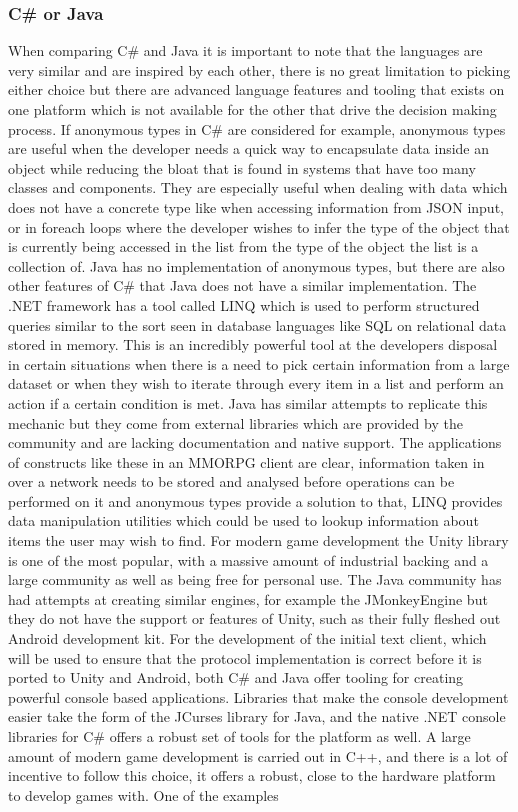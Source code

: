 \documentclass{article}
\begin{document}
	\subsubsection{C\# or Java}
	When comparing C\# and Java it is important to note that the languages are very similar and are inspired by each other, there is no great limitation to picking either choice but there are advanced language features and tooling that exists on one platform which is not available for the other that drive the decision making process. If anonymous types in C\# are considered for example, anonymous types are useful when the developer needs a quick way to encapsulate data inside an object while reducing the bloat that is found in systems that have too many classes and components. They are especially useful when dealing with data which does not have a concrete type like when accessing information from JSON input, or in foreach loops where the developer wishes to infer the type of the object that is currently being accessed in the list from the type of the object the list is a collection of. Java has no implementation of anonymous types, but there are also other features of C\# that Java does not have a similar implementation. The .NET framework has a tool called LINQ which is used to perform structured queries similar to the sort seen in database languages like SQL on relational data stored in memory. This is an incredibly powerful tool at the developers disposal in certain situations when there is a need to pick certain information from a large dataset or when they wish to iterate through every item in a list and perform an action if a certain condition is met. Java has similar attempts to replicate this mechanic but they come from external libraries which are provided by the community and are lacking documentation and native support. The applications of constructs like these in an MMORPG client are clear, information taken in over a network needs to be stored and analysed before operations can be performed on it and anonymous types provide a solution to that, LINQ provides data manipulation utilities which could be used to lookup information about items the user may wish to find. For modern game development the Unity library is one of the most popular, with a massive amount of industrial backing and a large community as well as being free for personal use\cite{Unity3D}. The Java community has had attempts at creating similar engines, for example the JMonkeyEngine\cite{JMonkey} but they do not have the support or features of Unity, such as their fully fleshed out Android development kit. For the development of the initial text client, which will be used to ensure that the protocol implementation is correct before it is ported to Unity and Android, both C\# and Java offer tooling for creating powerful console based applications. Libraries that make the console development easier take the form of the JCurses library\cite{JCurses} for Java, and the native .NET console libraries for C\# offers a robust set of tools for the platform as well. A large amount of modern game development is carried out in C++, and there is a lot of incentive to follow this choice, it offers a robust, close to the hardware platform to develop games with. One of the examples 
\end{document}
